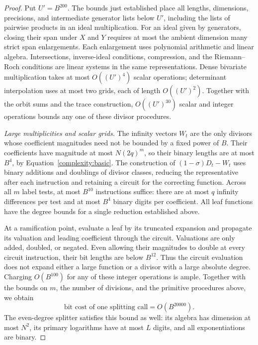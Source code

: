 \begin{proof}
Put $U'=B^{200}$.  The bounds just established place all lengths,
dimensions, precisions, and intermediate generator lists below $U'$,
including the lists of pairwise products in an ideal multiplication.
For an ideal given by generators, closing their span under $X$ and $Y$
requires at most the ambient dimension many strict span enlargements.
Each enlargement uses polynomial arithmetic and linear algebra.
Intersections, inverse-ideal conditions, compression, and the
Riemann--Roch conditions are linear systems in the same representations.
Dense bivariate multiplication takes at most $O((U')^4)$ scalar
operations; determinant interpolation uses at most two grids, each
of length $O((U')^2)$.  Together with the orbit sums and the trace
construction, $O((U')^{30})$ scalar and integer operations bounds any
one of these divisor procedures.

\smallskip
\noindent\emph{Large multiplicities and scalar grids.}
The infinity vectors $W_t$ are the only divisors whose coefficient
magnitudes need not be bounded by a fixed power of $B$.  Their
coefficients have magnitude at most $N(2q)^m$, so their binary lengths
are at most $B^4$, by Equation~\eqref{complexity:basic}.
The construction of $(1-\sigma)D_t-W_t$ uses binary additions and
doublings of divisor classes, reducing the representative after each
instruction and retaining a circuit for the correcting function.
Across all $m$ label tests, at most $B^{10}$ instructions suffice:
there are at most $q$ infinity differences per test and at most $B^4$
binary digits per coefficient.  All leaf functions have the degree
bounds for a single reduction established above.

At a ramification point, evaluate a leaf by its truncated expansion and
propagate its valuation and leading coefficient through the circuit.
Valuations are only added, doubled, or negated.  Even allowing their
magnitudes to double at every circuit instruction, their bit lengths
are below $B^{12}$.  Thus the circuit evaluation does not expand either
a large function or a divisor with a large absolute degree.
Charging $O(B^{100})$ for any of these integer operations is ample.
Together with the bounds on $m$, the number of divisions, and the
primitive procedures above, we obtain
\begin{equation}
 \text{bit cost of one splitting call}=O(B^{20000}).
 \label{complexity:split}
\end{equation}
The even-degree splitter satisfies this bound as well: its algebra has
dimension at most $N^2$, its primary logarithms have at most $L$ digits,
and all exponentiations are binary.


\end{proof}
